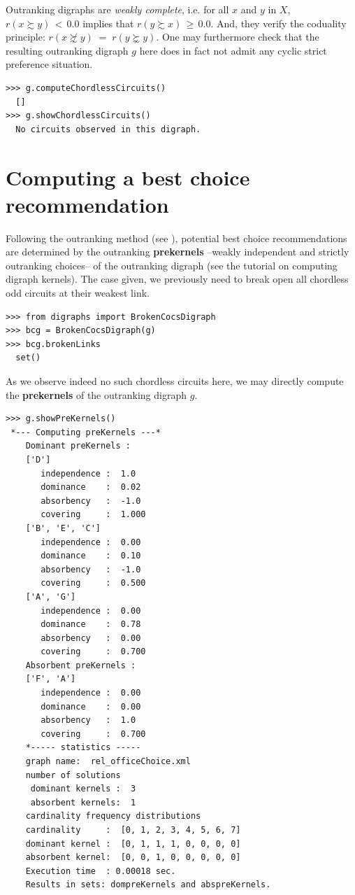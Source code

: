 Outranking digraphs are \emph{weakly complete}, i.e. for all $x$ and $y$ in $X$, $r(x \succsim y)\, <\, 0.0$ implies that $r(y \succsim x)\, \geq\, 0.0$. And, they verify the coduality principle:  $r(x \not\succsim y) \;=\; r(y \succnsim y)$. One may furthermore check that the resulting outranking digraph $g$ here does in fact not admit any cyclic strict preference situation.

\begin{lstlisting}
>>> g.computeChordlessCircuits()
  []
>>> g.showChordlessCircuits()
  No circuits observed in this digraph.
\end{lstlisting}

\section{Computing a \Rubis best choice recommendation}
\label{sec:6.3}

Following the \Rubis outranking method (see \citet{BIS-2008a}), potential best choice recommendations are determined by the outranking \textbf{prekernels} --weakly independent and strictly outranking choices-- of the outranking digraph (see the tutorial on computing digraph kernels). The case given, we previously need to break open all chordless odd circuits at their weakest link.

\begin{lstlisting}
>>> from digraphs import BrokenCocsDigraph
>>> bcg = BrokenCocsDigraph(g)
>>> bcg.brokenLinks
  set()
\end{lstlisting}

As we observe indeed no such chordless circuits here, we may directly compute the \textbf{prekernels} of the outranking digraph $g$.

\begin{lstlisting}[caption={Computing outranking and outranked prekernels},label=list:6.3]
>>> g.showPreKernels()
 *--- Computing preKernels ---*
    Dominant preKernels :
    ['D']
       independence :  1.0
       dominance    :  0.02
       absorbency   :  -1.0
       covering     :  1.000
    ['B', 'E', 'C']
       independence :  0.00
       dominance    :  0.10
       absorbency   :  -1.0
       covering     :  0.500
    ['A', 'G']
       independence :  0.00
       dominance    :  0.78
       absorbency   :  0.00
       covering     :  0.700
    Absorbent preKernels :
    ['F', 'A']
       independence :  0.00
       dominance    :  0.00
       absorbency   :  1.0
       covering     :  0.700
    *----- statistics -----
    graph name:  rel_officeChoice.xml
    number of solutions
     dominant kernels :  3
     absorbent kernels:  1
    cardinality frequency distributions
    cardinality     :  [0, 1, 2, 3, 4, 5, 6, 7]
    dominant kernel :  [0, 1, 1, 1, 0, 0, 0, 0]
    absorbent kernel:  [0, 0, 1, 0, 0, 0, 0, 0]
    Execution time  : 0.00018 sec.
    Results in sets: dompreKernels and abspreKernels.
\end{lstlisting}
  
